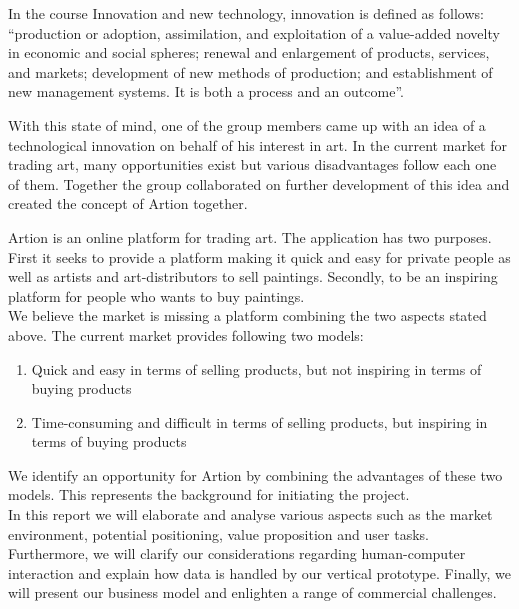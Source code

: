 In the course Innovation and new technology, innovation is defined as follows: “production or adoption, assimilation, and exploitation of a value-added novelty in economic and social spheres; renewal and enlargement of products, services, and markets; development of new methods of production; and establishment of new management systems. It is both a process and an outcome”.  

With this state of mind, one of the group members came up with an idea of a technological innovation on behalf of his interest in art. In the current market for trading art, many opportunities exist but various disadvantages follow each one of them. Together the group collaborated on further development of this idea and created the concept of Artion together.

Artion is an online platform for trading art. The application has two purposes. First it seeks to provide a platform making it quick and easy for private people as well as artists and art-distributors to sell paintings. Secondly, to be an inspiring platform for people who wants to buy paintings. \\

We believe the market is missing a platform combining the two aspects stated above. The current market provides following two models:
\begin{enumerate}
    \item Quick and easy in terms of selling products, but not inspiring in terms of buying products
    \item Time-consuming and difficult in terms of selling products, but inspiring in terms of buying products
\end{enumerate}
We identify an opportunity for Artion by combining the advantages of these two models. This represents the background for initiating the project.\\

In this report we will elaborate and analyse various aspects such as the market environment, potential positioning, value proposition and user tasks. Furthermore, we will clarify our considerations regarding human-computer interaction and explain how data is handled by our vertical prototype. Finally, we will present our business model and enlighten a range of commercial challenges.

